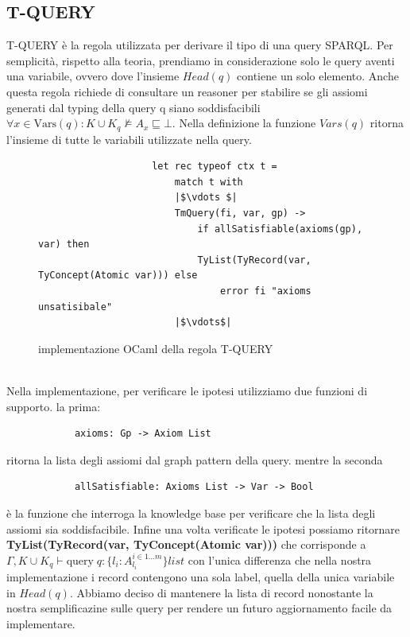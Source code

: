             \subsection{T-QUERY}
            T-QUERY è la regola utilizzata per derivare il tipo di una query SPARQL. Per semplicità, rispetto alla teoria, prendiamo in considerazione solo le query
            aventi una variabile, ovvero dove l'insieme $Head(q)$ contiene un solo elemento. Anche questa regola richiede di consultare un reasoner per stabilire se
            gli assiomi generati dal typing della query q siano soddisfacibili $\forall x \in \textrm{Vars}(q) : K \cup K_q \nvDash A_x \sqsubseteq \bot$. 
            Nella definizione la funzione $Vars(q)$ ritorna l'insieme di tutte le variabili utilizzate nella query.
            \begin{figure}[h] 
                \begin{verbatim}
                    let rec typeof ctx t =
                        match t with
                        |$\vdots $|
                        TmQuery(fi, var, gp) ->
                            if allSatisfiable(axioms(gp), var) then
                            TyList(TyRecord(var, TyConcept(Atomic var))) else
                                error fi "axioms unsatisibale"
                        |$\vdots$|
                \end{verbatim}
            \caption{implementazione OCaml della regola T-QUERY}
            \end{figure}
            \\Nella implementazione, per verificare le ipotesi utilizziamo due funzioni di supporto. la prima: 
            \begin{verbatim}
            axioms: Gp -> Axiom List
            \end{verbatim}  
            ritorna la lista degli assiomi dal graph pattern della query. mentre la seconda
            \begin{verbatim}
            allSatisfiable: Axioms List -> Var -> Bool
            \end{verbatim}
            è la funzione che interroga la knowledge base per verificare che la lista degli assiomi sia soddisfacibile. Infine una volta verificate le ipotesi possiamo
            ritornare 
            \\\textbf{TyList(TyRecord(var, TyConcept(Atomic \; var)))} che corrisponde a $\Gamma,K \cup K_q \vdash \textrm{query} \; q : \{l_i : A_{l_i}^{i \in 1...m}\} list$
            con l'unica differenza che nella nostra implementazione i record contengono una sola label, quella della unica variabile in $Head(q)$. Abbiamo deciso di 
            mantenere la lista di record nonostante la nostra semplificazine sulle query per rendere un futuro aggiornamento facile da implementare.
